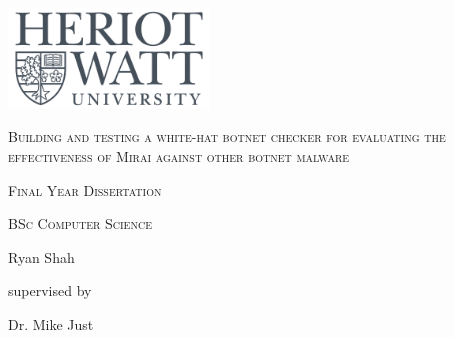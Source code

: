 \documentclass[11pt,a4paper]{report}
\begin{document}
	\begin{titlepage}
		\centering
		\vspace{4cm}
		\includegraphics[width=0.4\textwidth]{img/logo.png}\par
		\vspace{2cm}
		{\scshape\large Building and testing a white-hat botnet checker for evaluating the effectiveness of Mirai against other botnet malware\par}
		\vspace{2cm}
		{\scshape\large Final Year Dissertation\par}
		\vspace{0.5cm}
		{\scshape\large BSc Computer Science\par}
		\vspace{2cm}

		\vfill
			{\Large Ryan Shah\par}
			\vspace{1cm}
			supervised by\par
			Dr. Mike Just
		\vfill
	\end{titlepage}

	
	
	\tableofcontents

	
	
	
	
	

	
	

	\begin{appendices}
		
	\end{appendices}
\end{document}
